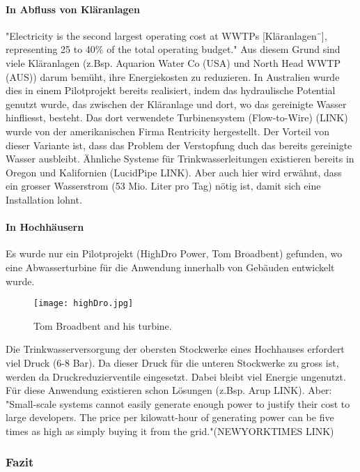 \paragraph{In Abfluss von Kläranlagen}
"Electricity is the second largest operating cost at WWTPs [Kläranlagen¨], representing 25 to 40\% of the total operating budget."
Aus diesem Grund sind viele Kläranlagen (z.Bsp. Aquarion Water Co (USA) und North Head WWTP (AUS)) darum bemüht, ihre Energiekosten zu reduzieren. In Australien wurde dies in einem Pilotprojekt bereits realisiert, indem das hydraulische Potential genutzt wurde, das zwischen der Kläranlage und dort, wo das gereinigte Wasser hinfliesst, besteht. Das dort verwendete Turbinensystem (Flow-to-Wire) (LINK) wurde von der amerikanischen Firma Rentricity hergestellt. Der Vorteil von dieser Variante ist, dass das Problem der Verstopfung duch das bereits gereinigte Wasser ausbleibt.
Ähnliche Systeme für Trinkwasserleitungen existieren bereits in Oregon und Kalifornien (LucidPipe LINK). Aber auch hier wird erwähnt, dass ein grosser Wasserstrom (53 Mio. Liter pro Tag) nötig ist, damit sich eine Installation lohnt.
\paragraph{In Hochhäusern}
Es wurde nur ein Pilotprojekt (HighDro Power, Tom Broadbent) gefunden, wo eine Abwasserturbine für die Anwendung innerhalb von Gebäuden entwickelt wurde.
\begin{figure}
\centering
\texttt{[image: highDro.jpg]}
\caption{Tom Broadbent and his turbine.}
\label{fig:turbineTomBroadBent}
\end{figure}
Die Trinkwasserversorgung der obersten Stockwerke eines Hochhauses erfordert viel Druck (6-8 Bar). Da dieser Druck für die unteren Stockwerke zu gross ist, werden da Druckreduzierventile eingesetzt. Dabei bleibt viel Energie ungenutzt. Für diese Anwendung existieren schon Lösungen (z.Bsp. Arup LINK). Aber:
"Small-scale systems cannot easily generate enough power to justify their cost to large developers. The price per kilowatt-hour of generating power can be five times as high as simply buying it from the grid."(NEWYORKTIMES LINK)
\subsubsection{Fazit}
\clearpage 

